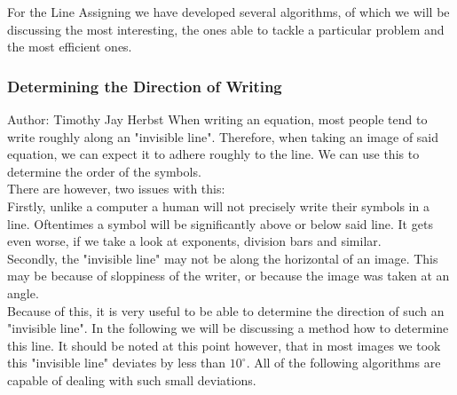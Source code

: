 \documentclass[12pt]{article}
\begin{document}
	For the Line Assigning we have developed several algorithms, of which we will be discussing the most interesting, the ones able to tackle a particular problem and the most efficient ones.
	
	\subsubsection{Determining the Direction of Writing}
	\small{Author: Timothy Jay Herbst} \newline \newline
	When writing an equation, most people tend to write roughly along an "invisible line".
	Therefore, when taking an image of said equation, we can expect it to adhere roughly to the line.
	We can use this to determine the order of the symbols.\\
	There are however, two issues with this:\\
	Firstly, unlike a computer a human will not precisely write their symbols in a line.
	Oftentimes a symbol will be significantly above or below said line.
	It gets even worse, if we take a look at exponents, division bars and similar.\\
	Secondly, the "invisible line" may not be along the horizontal of an image.
	This may be because of sloppiness of the writer, or because the image was taken at an angle.\\
	Because of this, it is very useful to be able to determine the direction of such an "invisible line".
	In the following we will be discussing a method how to determine this line.
	It should be noted at this point however, that in most images we took this "invisible line" deviates by less than $10^\circ$.
	All of the following algorithms are capable of dealing with such small deviations.\\
	
	
	
	
	
\end{document}
